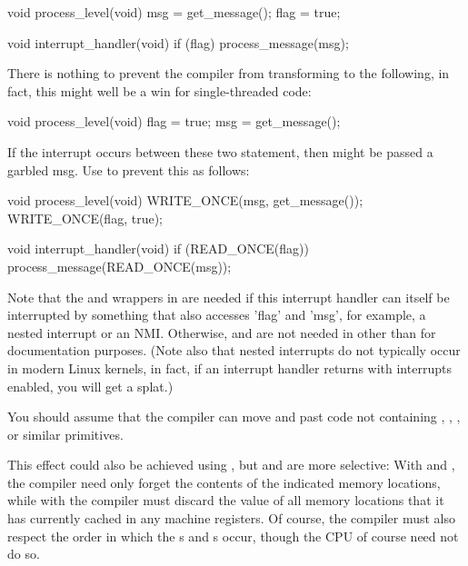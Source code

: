 \begin{itemize}
\begin{VerbatimU}
	void process_level(void)
	{
		msg = get_message();
		flag = true;
	}

	void interrupt_handler(void)
	{
		if (flag)
			process_message(msg);
	}
\end{VerbatimU}

     There is nothing to prevent the compiler from transforming
      to the following, in fact, this might well be a
     win for single-threaded code:

\begin{VerbatimU}
	void process_level(void)
	{
		flag = true;
		msg = get_message();
	}
\end{VerbatimU}

     If the interrupt occurs between these two statement, then
      might be passed a garbled msg.
     Use  to prevent this as follows:

\begin{VerbatimU}
	void process_level(void)
	{
		WRITE_ONCE(msg, get_message());
		WRITE_ONCE(flag, true);
	}

	void interrupt_handler(void)
	{
		if (READ_ONCE(flag))
			process_message(READ_ONCE(msg));
	}
\end{VerbatimU}

     Note that the  and  wrappers in
      are needed if this interrupt handler can itself
     be interrupted by something that also accesses 'flag' and 'msg',
     for example, a nested interrupt or an NMI\@.
     Otherwise,  and  are not needed
     in  other than for documentation purposes.
     (Note also that nested interrupts do not typically occur in modern
     Linux kernels, in fact, if an interrupt handler returns with
     interrupts enabled, you will get a  splat.)

     You should assume that the compiler can move  and
      past code not containing ,
     , , or similar primitives.

     This effect could also be achieved using , but
      and  are more selective:
     With  and , the compiler need only
     forget the contents of the indicated memory locations, while with
      the compiler must discard the value of all memory
     locations that it has currently cached in any machine registers.
     Of course, the compiler must also respect the order in which the
     s and s occur, though the CPU of
     course need not do so.


\end{itemize}
